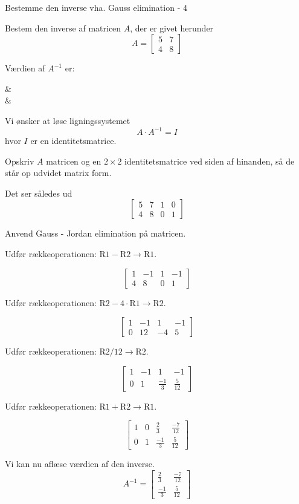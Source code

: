 \documentclass{article}
\begin{document}
\begin{exercise}{Bestemme den inverse vha. Gauss elimination - 4}

Bestem den inverse af matricen $A$, der er givet herunder
\[
A = \left[\begin{array}{cc}
5 & 7 \\
4 & 8
\end{array} \right]
\]

Værdien af $A^{-1}$ er:
\begin{answermatrix}
 &  \\
 & 
\end{answermatrix}

\hint
Vi ønsker at løse ligningssystemet
\[
A \cdot A^{-1} = I
\]
hvor $I$ er en identitetsmatrice.

\hint
Opskriv $A$ matricen og en $2 \times 2$ identitetsmatrice
ved siden af hinanden, så de står op udvidet matrix form.

\hint
Det ser således ud
\[
\left[\begin{array}{cc|cc}
5 & 7 & 1 & 0 \\
4 & 8 & 0 & 1
\end{array} \right]
\]

\hint
Anvend Gauss - Jordan elimination på matricen.

\hint
Udfør rækkeoperationen: $\text{R1} - \text{R2} \to \text{R1}$.

\hint
\[
\left[\begin{array}{cc|cc}
1 & -1 & 1 & -1 \\
4 & 8 & 0 & 1
\end{array} \right]
\]

\hint
Udfør rækkeoperationen: $\text{R2} - 4 \cdot \text{R1} \to \text{R2}$.

\hint
\[
\left[\begin{array}{cc|cc}
1 & -1 & 1 & -1 \\
0 & 12 & -4 & 5
\end{array} \right]
\]

\hint
Udfør rækkeoperationen: $\text{R2} / 12 \to \text{R2}$.

\hint
\[
\left[\begin{array}{cc|cc}
1 & -1 & 1 & -1 \\
0 & 1 & \frac{-1}{3} & \frac{5}{12}
\end{array} \right]
\]

\hint
Udfør rækkeoperationen: $\text{R1} + \text{R2} \to \text{R1}$.

\hint
\[
\left[\begin{array}{cc|cc}
1 & 0 & \frac{2}{3} & \frac{-7}{12} \\
0 & 1 & \frac{-1}{3} & \frac{5}{12}
\end{array} \right]
\]

\hint
Vi kan nu aflæse værdien af den inverse.
\[
A^{-1} = \left[\begin{array}{cc}
\frac{2}{3} & \frac{-7}{12} \\
\frac{-1}{3} & \frac{5}{12}
\end{array} \right]
\]


\end{exercise}
\end{document}
